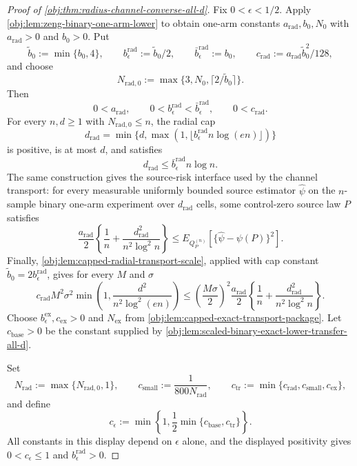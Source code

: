 \begin{proof}[Proof of \cref{obj:thm:radius-channel-converse-all-d}]
Fix \(0<\epsilon<1/2\).  Apply \cref{obj:lem:zeng-binary-one-arm-lower} to obtain one-arm constants
\(a_{\mathrm{rad}},b_0,N_0\) with \(a_{\mathrm{rad}}>0\) and \(b_0>0\).  Put
\[
\tilde b_0:=\min\{b_0,4\},
\qquad
b_{\epsilon}^{\mathrm{rad}}:=\tilde b_0/2,
\qquad
\bar b_{\epsilon}^{\mathrm{rad}}:=b_0,
\qquad
c_{\mathrm{rad}}:=a_{\mathrm{rad}}\tilde b_0^2/128,
\]
and choose
\[
N_{\mathrm{rad},0}:=\max\{3,N_0,\lceil 2/\tilde b_0\rceil\}.
\]
Then
\[
0<a_{\mathrm{rad}},
\qquad
0<b_{\epsilon}^{\mathrm{rad}}<\bar b_{\epsilon}^{\mathrm{rad}},
\qquad
0<c_{\mathrm{rad}}.
\]
For every \(n,d\ge1\) with \(N_{\mathrm{rad},0}\le n\), the radial cap
\[
d_{\mathrm{rad}}
=
\min\{d,\max(1,\lfloor b_{\epsilon}^{\mathrm{rad}}n\log(en)\rfloor)\}
\]
is positive, is at most \(d\), and satisfies
\[
d_{\mathrm{rad}}
\le
\bar b_{\epsilon}^{\mathrm{rad}}n\log n .
\]
The same construction gives the source-risk interface used by the channel transport: for every measurable uniformly bounded source estimator \(\widehat\psi\) on the \(n\)-sample binary one-arm experiment over \(d_{\mathrm{rad}}\) cells, some control-zero source law \(P\) satisfies
\[
\frac{a_{\mathrm{rad}}}{2}
\left\{\frac1n+\frac{d_{\mathrm{rad}}^2}{n^2\log^2 n}\right\}
\le
E_{Q_P^{(n)}}
\left[
\{\widehat\psi-\psi(P)\}^2
\right].
\]
Finally, \cref{obj:lem:capped-radial-transport-scale}, applied with cap constant \(\tilde b_0=2b_{\epsilon}^{\mathrm{rad}}\), gives for every \(M\) and \(\sigma\)
\[
c_{\mathrm{rad}}M^2\sigma^2
\min\left(1,\frac{d^2}{n^2\log^2(en)}\right)
\le
\left(\frac{M\sigma}{2}\right)^2
\frac{a_{\mathrm{rad}}}{2}
\left\{\frac1n+\frac{d_{\mathrm{rad}}^2}{n^2\log^2 n}\right\}.
\]
Choose \(b_{\epsilon}^{\mathrm{ex}},c_{\mathrm{ex}}>0\) and \(N_{\mathrm{ex}}\) from \cref{obj:lem:capped-exact-transport-package}.  Let \(c_{\mathrm{base}}>0\) be the constant supplied by \cref{obj:lem:scaled-binary-exact-lower-transfer-all-d}. %

Set
\[
N_{\mathrm{rad}}:=\max\{N_{\mathrm{rad},0},1\},
\qquad
c_{\mathrm{small}}:=\frac{1}{800N_{\mathrm{rad}}},
\qquad
c_{\mathrm{tr}}:=\min\{c_{\mathrm{rad}},c_{\mathrm{small}},c_{\mathrm{ex}}\},
\]
and define
\[
c_\epsilon
:=
\min\left\{1,\frac12\min\{c_{\mathrm{base}},c_{\mathrm{tr}}\}\right\}.
\]
All constants in this display depend on \(\epsilon\) alone, and the displayed positivity gives \(0<c_\epsilon\le1\) and \(b_{\epsilon}^{\mathrm{rad}}>0\). %


\end{proof}
